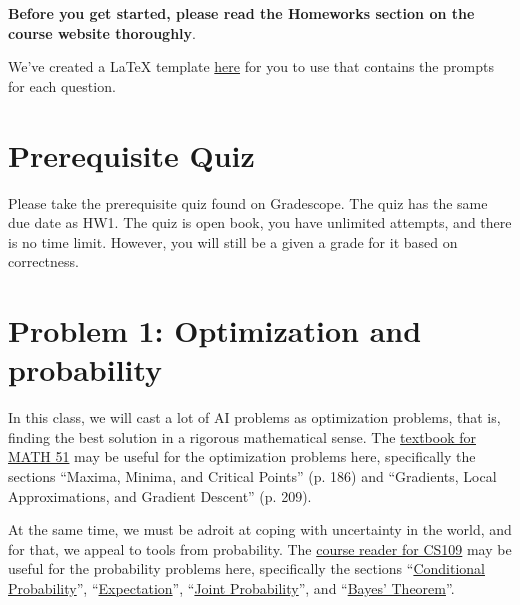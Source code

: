 \documentclass{article}
\theoremstyle{case}
\theoremstyle{definition}
\begin{document}
\textbf{Before you get started, please read the Homeworks section on the course website thoroughly}.

We've created a LaTeX template \href{../../with-prompt-templates/hw1-foundations-template.zip}{here} for you to use that contains the prompts for each question.

\section*{Prerequisite Quiz}

Please take the prerequisite quiz found on Gradescope. The quiz has the same due date as HW1. The quiz is open book, you have unlimited attempts, and there is no time limit. However, you will still be a given a grade for it based on correctness.

\section*{Problem 1: Optimization and probability}

In this class, we will cast a lot of AI problems as optimization problems, that is, finding the best solution in a rigorous mathematical sense. The \href{https://web.stanford.edu/class/math51/stanford/math51book.pdf}{textbook for MATH 51} may be useful for the optimization problems here, specifically the sections ``Maxima, Minima, and Critical Points'' (p. 186) and ``Gradients, Local Approximations, and Gradient Descent'' (p. 209).

At the same time, we must be adroit at coping with uncertainty in the world, and for that, we appeal to tools from probability. The \href{https://chrispiech.github.io/probabilityForComputerScientists/en/}{course reader for CS109} may be useful for the probability problems here, specifically the sections ``\href{https://chrispiech.github.io/probabilityForComputerScientists/en/part1/cond_prob/}{Conditional Probability}'', ``\href{https://chrispiech.github.io/probabilityForComputerScientists/en/part2/expectation/}{Expectation}'', ``\href{https://chrispiech.github.io/probabilityForComputerScientists/en/part3/joint/}{Joint Probability}'', and ``\href{https://chrispiech.github.io/probabilityForComputerScientists/en/part1/bayes_theorem/}{Bayes' Theorem}''.
\end{document}
